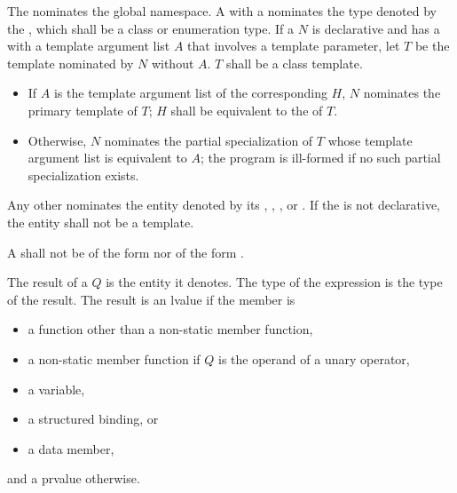 \pnum
The  \tcode{::} nominates
the global namespace.
A  with a 
nominates the type denoted by the ,
which shall be a class or enumeration type.
If a  $N$
is declarative and
has a  with a template argument list $A$
that involves a template parameter,
let $T$ be the template nominated by $N$ without $A$.
$T$ shall be a class template.
\begin{itemize}
\item
If $A$ is the template argument list of
the corresponding  $H$,
$N$ nominates the primary template of $T$;
$H$ shall be equivalent to
the  of $T$.
\item
Otherwise, $N$ nominates the partial specialization of $T$
whose template argument list is equivalent to $A$;
the program is ill-formed if no such partial specialization exists.
\end{itemize}
Any other  nominates
the entity denoted by its
,
,
, or
.
If the  is not declarative,
the entity shall not be a template.

\pnum
A  shall not be of the form
  \tcode{\~}
nor of the form
 \tcode{::} \tcode{\~} .

\pnum
The result of a  $Q$ is
the entity it denotes.
The type of the expression is the type of the result.
The result is an lvalue if the member is
\begin{itemize}
\item
a function other than a non-static member function,
\item
a non-static member function
if $Q$ is the operand of a unary \tcode{\&} operator,
\item
a variable,
\item
a structured binding, or
\item
a data member,
\end{itemize}
and a prvalue otherwise.

